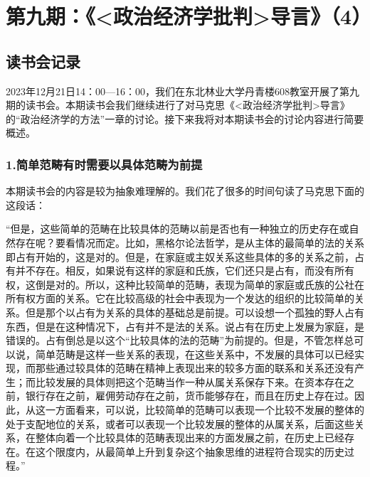 \documentclass[a4paper,twoside,12pt,AutoFakeBold]{ctexart}
\begin{document}
\section{第九期：《<政治经济学批判>导言》（4）}
\subsection{读书会记录}
2023年12月21日14：00—16：00，我们在东北林业大学丹青楼608教室开展了第九期的读书会。本期读书会我们继续进行了对马克思《<政治经济学批判>导言》的“政治经济学的方法”一章的讨论。接下来我将对本期读书会的讨论内容进行简要概述。
\subsubsection{1.简单范畴有时需要以具体范畴为前提}
本期读书会的内容是较为抽象难理解的。我们花了很多的时间句读了马克思下面的这段话：
\begin{adjustwidth}{2em}{2em}
    \qquad\fangsong
“但是，这些简单的范畴在比较具体的范畴以前是否也有一种独立的历史存在或自然存在呢？要看情况而定。比如，黑格尔论法哲学，是从主体的最简单的法的关系即占有开始的，这是对的。但是，在家庭或主奴关系这些具体的多的关系之前，占有并不存在。相反，如果说有这样的家庭和氏族，它们还只是占有，而没有所有权，这倒是对的。所以，这种比较简单的范畴，表现为简单的家庭或氏族的公社在所有权方面的关系。它在比较高级的社会中表现为一个发达的组织的比较简单的关系。但是那个以占有为关系的具体的基础总是前提。可以设想一个孤独的野人占有东西，但是在这种情况下，占有并不是法的关系。说占有在历史上发展为家庭，是错误的。占有倒总是以这个“比较具体的法的范畴”为前提的。但是，不管怎样总可以说，简单范畴是这样一些关系的表现，在这些关系中，不发展的具体可以已经实现，而那些通过较具体的范畴在精神上表现出来的较多方面的联系和关系还没有产生；而比较发展的具体则把这个范畴当作一种从属关系保存下来。在资本存在之前，银行存在之前，雇佣劳动存在之前，货币能够存在，而且在历史上存在过。因此，从这一方面看来，可以说，比较简单的范畴可以表现一个比较不发展的整体的处于支配地位的关系，或者可以表现一个比较发展的整体的从属关系，后面这些关系，在整体向着一个比较具体的范畴表现出来的方面发展之前，在历史上已经存在。在这个限度内，从最简单上升到复杂这个抽象思维的进程符合现实的历史过程。”
\end{adjustwidth}
\end{document}
